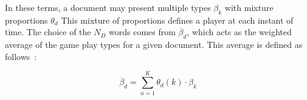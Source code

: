 %
%  
%  
%  
%
%



In these terms, a document may present multiple types $\beta_{k}$ with mixture proportions $\theta_{d}$ This mixture of proportions defines a player at each instant of time. The choice of the $N_{D}$ words comes from $\overline{\beta}_{d}$, which acts as the weighted average of the game play types for a given document. This average is defined as follows~\cite{blei_latent_2003,smith_mining_2016}:

\begin{equation}
\overline{\beta}_{d} = \sum_{n=1}^{K} \theta_{d}(k) \cdot \beta_{k}
\end{equation}

